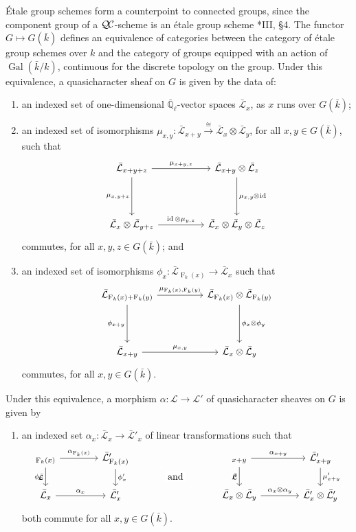 \documentclass[11pt]{amsart}
\makeatletter
\theoremstyle{plain}
\theoremstyle{definition}
\theoremstyle{remark}
\newcommand{\EE}{\mathbb{\bar Q}_\ell}
\newcommand{\bFq}{\bar{k}}
\newcommand{\Fq}{k}
\DeclareMathOperator{\Gal}{Gal}
\newcommand{\Frob}[1]{\operatorname{F}_{#1}}
\DeclareMathOperator{\id}{id}
\newcommand{\iso}{{\ \cong\ }}
\newcommand{\qcs}[1]{{\mathcal{#1}}}
\newcommand{\gqcs}[1]{{\mathcal{\bar #1}}}
\newcommand{\QC}{{\mathcal{Q\hskip-0.8pt C}}}
\newcommand{\labitem}[2]{%
\def\@itemlabel{\textbf{#1}}
\item
\def\@currentlabel{#1}\label{#2}}
\newcommand{\tight}[3]{\hspace{-#1pt}{#2}\hspace{-#3pt}}
\makeatother
\begin{document}
\'Etale group schemes form a counterpoint to connected groups,
since the component group of a $\QC$-scheme
is an \'etale group scheme \cite{vdGeer-Moonen:AbelianVarieties}*{III, \S 4}.
The functor $G \mapsto G(\bFq)$ defines an equivalence of categories
between the category of \'etale group schemes over $\Fq$ and the category of groups equipped
with an action of $\Gal(\bFq/\Fq)$, continuous for the discrete topology on the group.
Under this equivalence, a quasicharacter sheaf on $G$ is given by the data of:
\begin{enumerate}
 \labitem{(cs.1)}{cs.1} an indexed set of one-dimensional
  $\EE$-vector spaces $\gqcs{L}_x$, as $x$ runs over
  $G(\bFq)$;

 \labitem{(cs.2)}{cs.2} an indexed set of isomorphisms
  $\mu_{x,y} : \gqcs{L}_{x+y} \xrightarrow{\iso} \gqcs{L}_{x} \otimes\gqcs{L}_{y}$,
  for all $x,y \in G(\bFq)$, such that
  \[
   \begin{tikzcd}[row sep=40]
    \gqcs{L}_{x+y+z} \arrow{rr}{\mu_{x+y,z}} \arrow[swap]{d}{\mu_{x,y+z}}
    && \gqcs{L}_{x+y}\otimes\gqcs{L}_{z} \dar{\mu_{x,y} \tight{0.5}{\otimes}{1} \id} \\
    \gqcs{L}_{x} \otimes\gqcs{L}_{y+z} \arrow{rr}{\id \otimes\mu_{y,z}}
    && \gqcs{L}_{x} \otimes\gqcs{L}_{y} \otimes\gqcs{L}_{z}
   \end{tikzcd}
  \]
  commutes, for all $x,y,z\in G(\bFq)$; and

 \labitem{(cs.3)}{cs.3} an indexed set of isomorphisms $\phi_{x} : \gqcs{L}_{\Frob{\Fq}(x)} \to \gqcs{L}_x$
  such that
  \[
   \begin{tikzcd}[row sep=40]
    \gqcs{L}_{\Frob{\Fq}(x)+\Frob{\Fq}(y)} \arrow[swap]{d}{\phi_{x+y}} \arrow{rr}{\mu_{\Frob{\Fq}(x),\Frob{\Fq}(y)}}
    && \gqcs{L}_{\Frob{\Fq}(x)}\otimes\gqcs{L}_{\Frob{\Fq}(y)} \dar{\phi_x \tight{0}{\otimes}{0} \phi_y} \\
    \gqcs{L}_{x+y} \arrow{rr}{\mu_{x,y}}
    && \gqcs{L}_x \otimes\gqcs{L}_y
   \end{tikzcd}
  \]
  commutes, for all $x,y\in G(\bFq)$.
\end{enumerate}
Under this equivalence, a morphism $\alpha : \qcs{L} \to \qcs{L'}$ of quasicharacter sheaves on $G$ is given by 
\begin{enumerate}
 \labitem{(cs.4)}{cs.4} an indexed set $\alpha_x : \gqcs{L}_x \to \gqcs{L'}_x$
  of linear transformations such that
  \[
   \begin{tikzcd}[column sep=40]
    \arrow[swap]{d}{\phi_x} \gqcs{L}_{\Frob{\Fq}(x)} \rar{\alpha_{\Frob{\Fq}(x)}} & \gqcs{L'}_{\Frob{\Fq}(x)} \dar{\phi_x'}
    &\arrow[draw=none]{d}[pos=.4,description]{\text{\normalsize{and}}}
    & \arrow[swap]{d}{\mu} \gqcs{L}_{x+y} \rar{\alpha_{x+y}} & \gqcs{L'}_{x+y} \dar{\mu'_{x+y}} \\
    \gqcs{L}_x \rar{\alpha_x} & \gqcs{L'}_x
    & {} & \gqcs{L}_x\otimes\gqcs{L}_y \rar{\alpha_x\otimes\alpha_y} & \gqcs{L'}_x \otimes\gqcs{L'}_y
   \end{tikzcd}
  \]
  both commute for all $x, y \in G(\bFq)$.
\end{enumerate}
\end{document}

